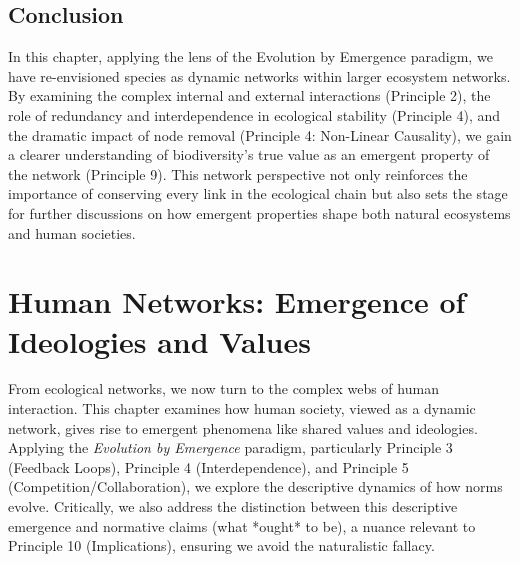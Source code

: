 \documentclass[12pt,openany]{book}
\let\cleardoublepage\clearpage %
\begin{document}
\section*{Conclusion}
In this chapter, applying the lens of the Evolution by Emergence paradigm, we have re-envisioned species as dynamic networks within larger ecosystem networks. By examining the complex internal and external interactions (Principle 2), the role of redundancy and interdependence in ecological stability (Principle 4), and the dramatic impact of node removal (Principle 4: Non-Linear Causality), we gain a clearer understanding of biodiversity's true value as an emergent property of the network (Principle 9). This network perspective not only reinforces the importance of conserving every link in the ecological chain but also sets the stage for further discussions on how emergent properties shape both natural ecosystems and human societies. %
\cleardoublepage

\chapter{Human Networks: Emergence of Ideologies and Values} %
\label{ch:HumanNetworks}

From ecological networks, we now turn to the complex webs of human interaction. This chapter examines how human society, viewed as a dynamic network, gives rise to emergent phenomena like shared values and ideologies. Applying the \emph{Evolution by Emergence} paradigm, particularly Principle 3 (Feedback Loops), Principle 4 (Interdependence), and Principle 5 (Competition/Collaboration), we explore the descriptive dynamics of how norms evolve. Critically, we also address the distinction between this descriptive emergence and normative claims (what *ought* to be), a nuance relevant to Principle 10 (Implications), ensuring we avoid the naturalistic fallacy. %
\end{document}
